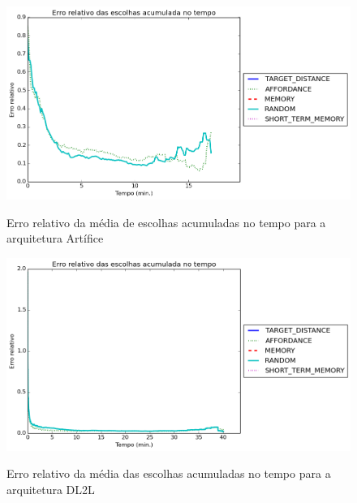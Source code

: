\begin{apendicesenv}
\begin{figure}[H]
    \centering
    \caption{Erro relativo da média de escolhas acumuladas no tempo para a arquitetura Artífice}
    \includegraphics[scale=0.6]{04-figuras/experiments/exp_1_artifice/accumulatedChoices_err.png}
    \label{fig:accChoices_artifice_err}
\end{figure}

\begin{figure}[H]
    \centering
    \caption{Erro relativo da média das escolhas acumuladas no tempo para a arquitetura DL2L}
    \includegraphics[scale=0.6]{04-figuras/experiments/exp_1_l2l/accumulatedChoices_err.png}
    \label{fig:accChoices_dl2l_err}
\end{figure}


\end{apendicesenv}
